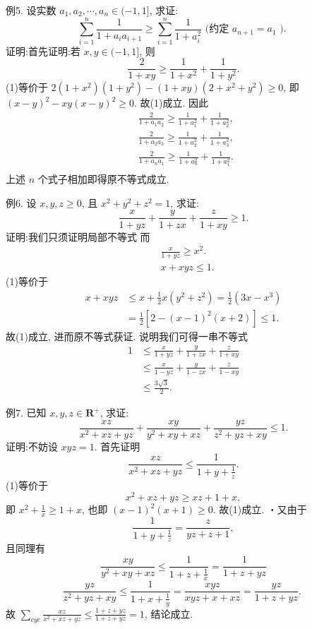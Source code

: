 例5. 设实数 $a_1, a_2, \cdots, a_n \in(-1,1]$, 求证:
$$
\sum_{i=1}^n \frac{1}{1+a_i a_{i+1}} \geqslant \sum_{i=1}^n \frac{1}{1+a_i^2} \text { (约定 } a_{n+1}=a_1 \text { ). }
$$
证明:首先证明:若 $x, y \in(-1,1]$, 则
$$
\frac{2}{1+x y} \geqslant \frac{1}{1+x^2}+\frac{1}{1+y^2} . \label{(1)}
$$
(1)等价于 $2\left(1+x^2\right)\left(1+y^2\right)-(1+x y)\left(2+x^2+y^2\right) \geqslant 0$,
即 $(x-y)^2-x y(x-y)^2 \geqslant 0$. 故(1)成立.
因此
$$
\begin{aligned}
& \frac{2}{1+a_1 a_2} \geqslant \frac{1}{1+a_1^2}+\frac{1}{1+a_2^2}, \\
& \frac{2}{1+a_2 a_3} \geqslant \frac{1}{1+a_2^2}+\frac{1}{1+a_3^2} \text {, } \\
& \frac{2}{1+a_n a_1} \geqslant \frac{1}{1+a_n^2}+\frac{1}{1+a_1^2} \text {. } \\
&
\end{aligned}
$$
上述 $n$ 个式子相加即得原不等式成立.



例6. 设 $x, y, z \geqslant 0$, 且 $x^2+y^2+z^2=1$, 求证:
$$
\frac{x}{1+y z}+\frac{y}{1+z x}+\frac{z}{1+x y} \geqslant 1 . \label{(1)}
$$
证明:我们只须证明局部不等式
而
$$
\begin{aligned}
& \frac{x}{1+y z} \geqslant x^2 . \\
& x+x y z \leqslant 1 .
\end{aligned}
$$
(1)等价于
$$
\begin{aligned}
x+x y z & \leqslant x+\frac{1}{2} x\left(y^2+z^2\right)=\frac{1}{2}\left(3 x-x^3\right) \\
& =\frac{1}{2}\left[2-(x-1)^2(x+2)\right] \leqslant 1 .
\end{aligned}
$$
故(1)成立, 进而原不等式获证.
说明我们可得一串不等式
$$
\begin{aligned}
1 & \leqslant \frac{x}{1+y z}+\frac{y}{1+z x}+\frac{z}{1+x y} \\
& \leqslant \frac{x}{1-y z}+\frac{y}{1-z x}+\frac{z}{1-x y} \\
& \leqslant \frac{3 \sqrt{3}}{2} .
\end{aligned}
$$



例7. 已知 $x, y, z \in \mathbf{R}^{+}$, 求证:
$$
\frac{x z}{x^2+x z+y z}+\frac{x y}{y^2+x y+x z}+\frac{y z}{z^2+y z+x y} \leqslant 1 . \label{(1)}
$$
证明:不妨设 $x y z=1$.
首先证明
$$
\frac{x z}{x^2+x z+y z} \leqslant \frac{1}{1+y+\frac{1}{z}} .
$$
(1)等价于
$$
x^2+x z+y z \geqslant x z+1+x,
$$
即 $x^2+\frac{1}{x} \geqslant 1+x$, 也即 $(x-1)^2(x+1) \geqslant 0$. 故(1)成立.
・又由于
$$
\frac{1}{1+y+\frac{1}{z}}=\frac{z}{y z+z+1},
$$
且同理有
$$
\frac{x y}{y^2+x y+x z} \leqslant \frac{1}{1+z+\frac{1}{x}}=\frac{1}{1+z+y z}
$$
$$
\frac{y z}{z^2+y z+x y} \leqslant \frac{1}{1+x+\frac{1}{y}}=\frac{x y z}{x y z+x+x z}=\frac{y z}{1+z+y z} \text {. }
$$
故 $\sum_{c y c} \frac{x z}{x^2+x z+y z} \leqslant \frac{1+z+y z}{1+z+y z}=1$, 结论成立.



